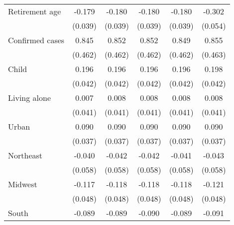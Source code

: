 {\begin{tabular}{l*{5}{c}}
\addlinespace
Retirement age      &      -0.179\sym{***}&      -0.180\sym{***}&      -0.180\sym{***}&      -0.180\sym{***}&      -0.302\sym{***}\\
                    &     (0.039)         &     (0.039)         &     (0.039)         &     (0.039)         &     (0.054)         \\
\addlinespace
Confirmed cases     &       0.845\sym{*}  &       0.852\sym{*}  &       0.852\sym{*}  &       0.849\sym{*}  &       0.855\sym{*}  \\
                    &     (0.462)         &     (0.462)         &     (0.462)         &     (0.462)         &     (0.463)         \\
\addlinespace
Child               &       0.196\sym{***}&       0.196\sym{***}&       0.196\sym{***}&       0.196\sym{***}&       0.198\sym{***}\\
                    &     (0.042)         &     (0.042)         &     (0.042)         &     (0.042)         &     (0.042)         \\
\addlinespace
Living alone        &       0.007         &       0.008         &       0.008         &       0.008         &       0.008         \\
                    &     (0.041)         &     (0.041)         &     (0.041)         &     (0.041)         &     (0.041)         \\
\addlinespace
Urban               &       0.090\sym{**} &       0.090\sym{**} &       0.090\sym{**} &       0.090\sym{**} &       0.090\sym{**} \\
                    &     (0.037)         &     (0.037)         &     (0.037)         &     (0.037)         &     (0.037)         \\
\addlinespace
Northeast           &      -0.040         &      -0.042         &      -0.042         &      -0.041         &      -0.043         \\
                    &     (0.058)         &     (0.058)         &     (0.058)         &     (0.058)         &     (0.058)         \\
\addlinespace
Midwest             &      -0.117\sym{**} &      -0.118\sym{**} &      -0.118\sym{**} &      -0.118\sym{**} &      -0.121\sym{**} \\
                    &     (0.048)         &     (0.048)         &     (0.048)         &     (0.048)         &     (0.048)         \\
\addlinespace
South               &      -0.089\sym{**} &      -0.089\sym{**} &      -0.090\sym{**} &      -0.089\sym{**} &      -0.091\sym{**} \\

\end{tabular}}
